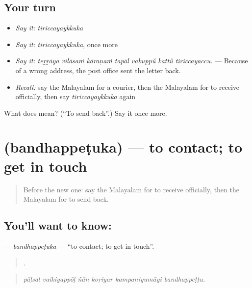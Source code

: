 \subsection*{Your turn}
\begin{itemize}
\raggedright
  \item \emph{Say it:} \emph{tiriccayaykkuka}
  \item \emph{Say it:} \emph{tiriccayaykkuka}, once more
  \item \emph{Say it:} \emph{teṟṟāya vilāsaṁ kāraṇaṁ tapāl vakuppŭ kattŭ tiriccayaccu.} — Because of a wrong address, the post office sent the letter back.
  \item \emph{Recall:} say the Malayalam for a courier, then the Malayalam for to receive officially, then say \emph{tiriccayaykkuka} again
\end{itemize}

\begin{tcolorbox}[breakable,colback=teal!4,colframe=teal!35!black,title={Before you move on}]
What does  mean? (\textquotedblleft{}To send back\textquotedblright{}.) Say it once more.
\end{tcolorbox}
\section[\texorpdfstring{\ml{ബന്ധപ്പെടുക} (bandhappeṭuka)}{ബന്ധപ്പെടുക (bandhappeṭuka)}]{ (bandhappeṭuka) — to contact; to get in touch}

\label{lesson:ML-C490-bandhappetuka}



\begin{quote}
Before the new one: say the Malayalam for to receive officially, then the Malayalam for to send back.
\end{quote}

\subsection*{You'll want to know: }
\textbf{} — \emph{bandhappeṭuka} — \textquotedblleft{}to contact; to get in touch\textquotedblright{}.

\begin{quote}
     .
\end{quote}

\begin{quote}
\emph{pāḻsal vaikiyappōḷ ñān koṟiyar kampaniyumāyi bandhappeṭṭu.}
\end{quote}


